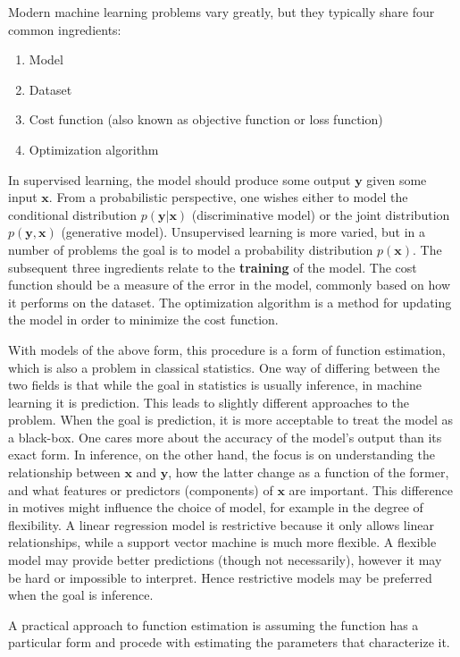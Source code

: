 \documentclass[twoside,english]{uiofysmaster}
\begin{document}
Modern machine learning problems vary greatly, but they typically share four common ingredients:
\begin{enumerate}
	\item Model
	\item Dataset
	\item Cost function (also known as objective function or loss function)
	\item Optimization algorithm
\end{enumerate}

In supervised learning, the model should produce some output $\bm{y}$ given some input $\bm{x}$. From a probabilistic perspective, one wishes either to model the conditional distribution $p(\bm{y}| \bm{x})$ (discriminative model) or the joint distribution $p(\bm{y}, \bm{x})$ (generative model). Unsupervised learning is more varied, but in a number of problems the goal is to model a probability distribution $p(\bm{x})$. The subsequent three ingredients relate to the \textbf{training} of the model. The cost function should be a measure of the error in the model, commonly based on how it performs on the dataset. The optimization algorithm is a method for updating the model in order to minimize the cost function.

With models of the above form, this procedure is a form of function estimation, which is also a problem in classical statistics. One way of differing between the two fields is that while the goal in statistics is usually inference, in machine learning it is prediction. This leads to slightly different approaches to the problem. When the goal is prediction, it is more acceptable to treat the model as a black-box. One cares more about the accuracy of the model's output than its exact form. In inference, on the other hand, the focus is on understanding the relationship between $\bm{x}$ and $\bm{y}$, how the latter change as a function of the former, and what features or predictors (components) of $\bm{x}$ are important. This difference in motives might influence the choice of model, for example in the degree of flexibility. A linear regression model is restrictive because it only allows linear relationships, while a support vector machine is much more flexible. A flexible model may provide better predictions (though not necessarily), however it may be hard or impossible to interpret. Hence restrictive models may be preferred when the goal is inference.

A practical approach to function estimation is assuming the function has a particular form and procede with estimating the parameters that characterize it.
\end{document}
